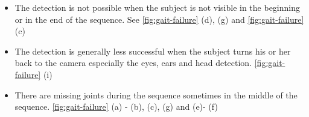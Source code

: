 \begin{itemize}
    \item The detection is not possible when the subject is not visible in the beginning or in the end of the sequence. See \autoref{fig:gait-failure} (d), (g) and \autoref{fig:gait-failure} (c)
    \item The detection is generally less successful  when the subject turns his or her back to the camera especially the eyes, ears and head detection. \autoref{fig:gait-failure} (i)
    \item There are missing joints during the sequence sometimes in the middle of the sequence. \autoref{fig:gait-failure} (a) - (b), (c), (g) and (e)- (f)
\end{itemize}
